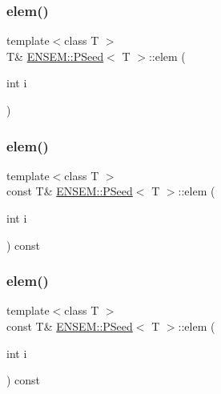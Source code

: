 \subsubsection{\texorpdfstring{elem()}{elem()}\hspace{0.1cm}{\footnotesize\ttfamily [2/4]}}
{\footnotesize\ttfamily template$<$class T $>$ \\
T\& \mbox{\hyperlink{classENSEM_1_1PSeed}{E\+N\+S\+E\+M\+::\+P\+Seed}}$<$ T $>$\+::elem (\begin{DoxyParamCaption}\item[{int}]{i }\end{DoxyParamCaption})\hspace{0.3cm}{\ttfamily [inline]}}

\mbox{\label{classENSEM_1_1PSeed_aa9151226aec3137be3417bbf36f770aa}} 
\subsubsection{\texorpdfstring{elem()}{elem()}\hspace{0.1cm}{\footnotesize\ttfamily [3/4]}}
{\footnotesize\ttfamily template$<$class T $>$ \\
const T\& \mbox{\hyperlink{classENSEM_1_1PSeed}{E\+N\+S\+E\+M\+::\+P\+Seed}}$<$ T $>$\+::elem (\begin{DoxyParamCaption}\item[{int}]{i }\end{DoxyParamCaption}) const\hspace{0.3cm}{\ttfamily [inline]}}

\mbox{\label{classENSEM_1_1PSeed_aa9151226aec3137be3417bbf36f770aa}} 
\subsubsection{\texorpdfstring{elem()}{elem()}\hspace{0.1cm}{\footnotesize\ttfamily [4/4]}}
{\footnotesize\ttfamily template$<$class T $>$ \\
const T\& \mbox{\hyperlink{classENSEM_1_1PSeed}{E\+N\+S\+E\+M\+::\+P\+Seed}}$<$ T $>$\+::elem (\begin{DoxyParamCaption}\item[{int}]{i }\end{DoxyParamCaption}) const\hspace{0.3cm}{\ttfamily [inline]}}

